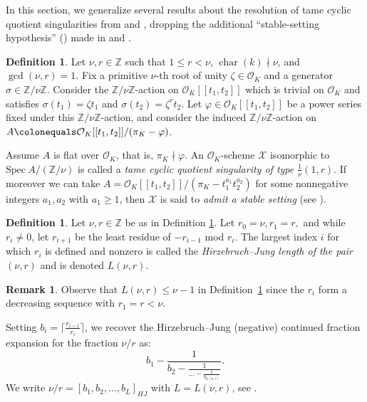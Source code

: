 \documentclass[12pt]{amsart}
\numberwithin{equation}{section}
\theoremstyle{definition}
\newtheorem{remark}[equation]{Remark}
\newtheorem{defn}[equation]{Definition}
\newcommand{\mc}[1]{\mathcal{#1}}
\newcommand{\Z}{\mathbb Z}
\renewcommand{\O}{\mathcal{O}}
\renewcommand{\phi}{\varphi}
\newcommand{\Spec}{\mathrm{Spec} \ }
\DeclareMathOperator{\chara}{char}
\begin{document}
In this section, we generalize several results about the resolution of tame cyclic quotient singularities from \cite{HN} and \cite{Steck}, dropping the additional ``stable-setting hypothesis'' () made in \cite{HN} and \cite{Steck}.
\begin{defn}\label{dfn: tame cyclic quotient admitting stable setting}
    Let $\nu,r\in\Z$ such that $1\leq r<\nu$, $\chara(k)\nmid \nu$,
    and $\gcd(\nu,r)=1$. Fix a primitive $\nu$-th root of unity $\zeta\in
    \O_K$ and a generator $\sigma\in\Z/\nu\Z$. Consider the
    $\Z/\nu\Z$-action on $\O_K[[t_1,t_2]]$ which is trivial on $\O_K$
    and satisfies $\sigma(t_1)=\zeta t_1$ and
    $\sigma(t_2)=\zeta^rt_2$. Let $\phi\in \O_K[[t_1,t_2]]$ be a power
    series fixed under this $\Z/\nu\Z$-action, and consider the
    induced $\Z/\nu\Z$-action on
    $A\colonequals\O_K[[t_1,t_2]]/(\pi_K-\phi)$.

    Assume $A$ is flat over $\mc{O}_K$, that is, $\pi_K \nmid \phi$.
    An $\O_K$-scheme $\mc{X}$ isomorphic to $\Spec A/({\Z/\nu})$ is called a \textit{tame cyclic quotient singularity of type $\frac{1}{\nu}(1,r)$}. If moreover we can take $A=\O_K[[t_1,t_2]]/(\pi_K-t_1^{a_1}t_2^{a_2})$ for some nonnegative integers $a_1,a_2$ with $a_1\geq1$, then $\mc{X}$ is said to \textit{admit a stable setting} (see \cite[Definition 4.1.5, Theorem 4.1.6, and Theorem 4.3.4]{Steck}).
\end{defn}

\begin{defn}\label{dfn: Hirzebruch--Jung length of pair}
    Let $\nu,r\in\Z$ be as in Definition \ref{dfn: tame cyclic quotient admitting stable setting}. Let $r_0=\nu,r_1=r,$ and while $r_i\neq 0$, let $r_{i+1}$ be the least residue of $-r_{i-1}$ mod $r_i$. The largest index $i$ for which $r_i$ is defined and nonzero is called the \textit{Hirzebruch--Jung length of the pair $(\nu,r)$} and is denoted $L(\nu,r)$.
\end{defn}

\begin{remark}\label{rmk: bound on HJ length of pair} Observe that $L(\nu,r)\leq \nu-1$ in Definition~\ref{dfn: Hirzebruch--Jung length of pair} since the $r_i$ form a decreasing sequence with $r_1=r<\nu$.
\end{remark}

Setting $b_i=\lceil\frac{r_{i-1}}{r_i}\rceil$, we recover the Hirzebruch--Jung (negative) continued fraction expansion for the fraction $\nu/r$ as:
    \[b_1-\frac{1}{b_2-\frac{1}{...-\frac{1}{b_{L(\nu,r)}}}}.\]  
We write $\nu/r = [b_1, b_2, \ldots, b_L]_{HJ}$ with $L = L(\nu, r)$, see
\cite[Definition~4.4.2.4]{HN}.
\end{document}
